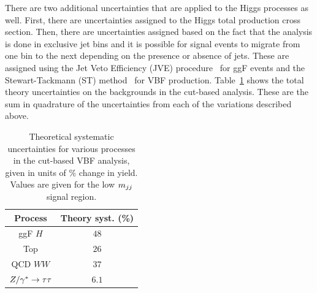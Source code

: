 
There are two additional uncertainties that are applied to the Higgs processes as well. First, there are uncertainties assigned to the Higgs total production cross section. Then, there are uncertainties assigned based on the fact that the analysis is done in exclusive jet bins and it is possible for signal events to migrate from one bin to the next depending on the presence or absence of jets. These are assigned using the Jet Veto Efficiency (JVE) procedure~\cite{LHCXSWG,JVE} for ggF events and the Stewart-Tackmann (ST) method~\cite{ST} for VBF production. Table~\ref{tab:vbf_cb_theosys} shows the total theory uncertainties on the backgrounds in the cut-based analysis. These are the sum in quadrature of the uncertainties from each of the variations described above. 


\begin{table}[h!]
\centering
\captionsetup{justification=centering}
\begin{tabular}{|c|c|}
\hline
Process & Theory syst. (\%)  \\ \hline
ggF $H$ & $48$ \\ \hline
Top & $26$ \\ \hline
QCD $WW$ & $37$ \\ \hline
$Z/\gamma^{\ast} \to \tau\tau$ & $6.1$ \\ \hline
\end{tabular}
\caption{Theoretical systematic uncertainties for various processes in the cut-based VBF analysis, given in units of \% change in yield. Values are given for the low $m_{jj}$ signal region.}
\label{tab:vbf_cb_theosys}
\end{table}

